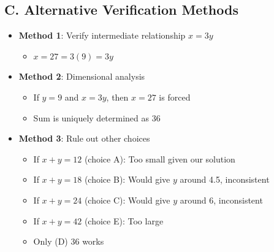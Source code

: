\documentclass[12pt]{article}
\begin{document}
\begin{verificationbox}
\subsection*{C. Alternative Verification Methods}
\begin{itemize}[leftmargin=*]
    \item \textbf{Method 1}: Verify intermediate relationship $x = 3y$
    \begin{itemize}
        \item $x = 27 = 3(9) = 3y$ \checkmark
    \end{itemize}
    \item \textbf{Method 2}: Dimensional analysis
    \begin{itemize}
        \item If $y = 9$ and $x = 3y$, then $x = 27$ is forced
        \item Sum is uniquely determined as 36
    \end{itemize}
    \item \textbf{Method 3}: Rule out other choices
    \begin{itemize}
        \item If $x+y = 12$ (choice A): Too small given our solution
        \item If $x+y = 18$ (choice B): Would give $y$ around 4.5, inconsistent
        \item If $x+y = 24$ (choice C): Would give $y$ around 6, inconsistent
        \item If $x+y = 42$ (choice E): Too large
        \item Only (D) 36 works
    \end{itemize}
\end{itemize}
\end{verificationbox}
\end{document}
